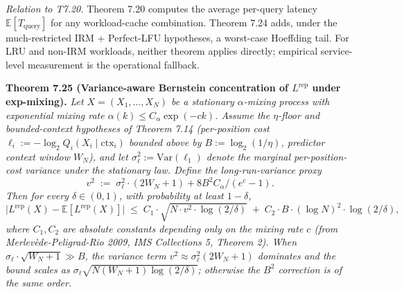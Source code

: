 \documentclass[
]{article}
\begin{document}
\emph{Relation to T7.20.}
Theorem 7.20 computes the average per-query latency
$\mathbb{E}[T_{\mathrm{query}}]$ for any workload-cache combination.
Theorem 7.24 adds, under the much-restricted IRM + Perfect-LFU
hypotheses, a worst-case Hoeffding tail. For LRU and non-IRM
workloads, neither theorem applies directly; empirical service-level
measurement is the operational fallback.

\textbf{Theorem 7.25 (Variance-aware Bernstein concentration of
$L^{\mathrm{rep}}$ under exp-mixing).} \emph{Let $X = (X_1, \ldots, X_N)$
be a stationary $\alpha$-mixing process with exponential mixing rate
$\alpha(k) \leq C_\alpha \exp(-c k)$. Assume the $\eta$-floor and
bounded-context hypotheses of Theorem 7.14 (per-position cost
$\ell_i := -\log_2 Q_i(X_i \mid \mathrm{ctx}_i)$ bounded above by
$B := \log_2(1/\eta)$, predictor context window $W_N$), and let
$\sigma_\ell^2 := \mathrm{Var}(\ell_1)$ denote the marginal
per-position-cost variance under the stationary law. Define the
long-run-variance proxy
\[
  v^2 \;:=\; \sigma_\ell^2 \cdot (2 W_N + 1) + 8 B^2 C_\alpha / (e^c - 1).
\]
Then for every $\delta \in (0, 1)$, with probability at least
$1 - \delta$,
\[
  \bigl| L^{\mathrm{rep}}(X) - \mathbb{E}[L^{\mathrm{rep}}(X)] \bigr|
  \;\leq\; C_1 \cdot \sqrt{N \cdot v^2 \cdot \log(2/\delta)}
  \;+\; C_2 \cdot B \cdot (\log N)^2 \cdot \log(2/\delta),
\]
where $C_1, C_2$ are absolute constants depending only on the mixing
rate $c$ (from Merlev\`ede-Peligrad-Rio 2009, IMS Collections 5,
Theorem 2). When $\sigma_\ell \cdot \sqrt{W_N+1} \gg B$, the variance
term $v^2 \approx \sigma_\ell^2 (2 W_N + 1)$ dominates and the bound
scales as $\sigma_\ell \sqrt{N(W_N+1)\log(2/\delta)}$; otherwise the
$B^2$ correction is of the same order.}
\end{document}

